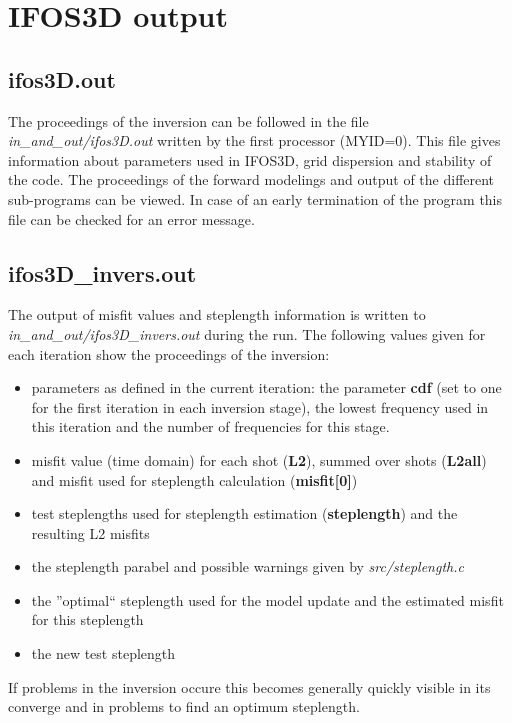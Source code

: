 \section{IFOS3D output}
\subsection{ifos3D.out}
The proceedings of the inversion can be followed in the file \textit{in\_and\_out/ifos3D.out} written by the first processor (MYID=0). This file gives information about parameters used in IFOS3D, grid dispersion and stability of the code. The proceedings of the forward modelings and output of the different sub-programs can be viewed. In case of an early termination of the program this file can be checked for an error message.
\subsection{ifos3D\_invers.out}
The output of misfit values and steplength information is written to \textit{in\_and\_out/ifos3D\_invers.out} during the run. The following values given for each iteration show the proceedings of the inversion:
\begin{itemize}
\item parameters as defined in the current iteration: the parameter \textbf{cdf} (set to one for the first iteration in each inversion stage), the lowest frequency used in this iteration and the number of frequencies for this stage. 
 \item misfit value (time domain) for each shot (\textbf{L2}), summed over shots (\textbf{L2all}) and misfit used for steplength calculation (\textbf{misfit[0]})
 \item test steplengths used for steplength estimation (\textbf{steplength}) and the resulting L2 misfits
 \item the steplength parabel and possible warnings given by \textit{src/steplength.c}
 \item the ''optimal`` steplength used for the model update and the estimated misfit for this steplength
 \item the new test steplength
\end{itemize}
If problems in the inversion occure this becomes generally quickly visible in its converge and in problems to find an optimum steplength.

